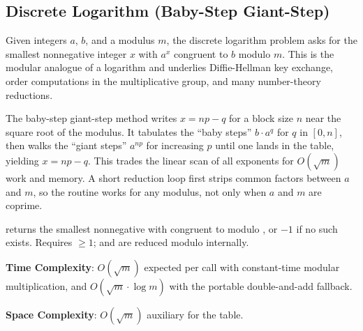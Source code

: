 \subsection{Discrete Logarithm (Baby-Step Giant-Step)}
\label{sec:6.3.5}
Given integers $a$, $b$, and a modulus $m$, the discrete logarithm problem asks for the smallest nonnegative integer $x$ with $a^x$ congruent to $b$ modulo $m$. This is the modular analogue of a logarithm and underlies Diffie-Hellman key exchange, order computations in the multiplicative group, and many number-theory reductions.

The baby-step giant-step method writes $x = np - q$ for a block size $n$ near the square root of the modulus. It tabulates the ``baby steps'' $b \cdot a^q$ for $q$ in $[0, n]$, then walks the ``giant steps'' $a^{np}$ for increasing $p$ until one lands in the table, yielding $x = np - q$. This trades the linear scan of all exponents for $O(\sqrt{m})$ work and memory. A short reduction loop first strips common factors between $a$ and $m$, so the routine works for any modulus, not only when $a$ and $m$ are coprime.

\begin{compactitem}
  \item {} returns the smallest nonnegative  with  congruent to  modulo , or $-1$ if no such  exists. Requires  $\geq 1$;  and  are reduced modulo  internally.
\end{compactitem}

\textbf{Time Complexity}: $O(\sqrt{m})$ expected per call with constant-time modular multiplication, and $O(\sqrt{m} \cdot \log m)$ with the portable double-and-add fallback.

\textbf{Space Complexity}: $O(\sqrt{m})$ auxiliary for the table.

